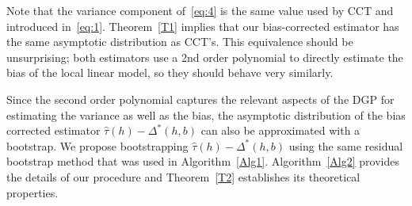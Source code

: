 \documentclass[12pt,fleqn]{article}
\begin{document}
Note that the variance component of~\eqref{eq:4} is the same value used by CCT
and introduced in~\eqref{eq:1}. Theorem~\ref{T1} implies that our bias-corrected
estimator has the same asymptotic distribution as CCT's. This equivalence should
be unsurprising; both estimators use a 2nd order polynomial to directly estimate
the bias of the local linear model, so they should behave very similarly.

Since the second order polynomial captures the relevant aspects of the DGP for
estimating the variance as well as the bias, the asymptotic distribution of the
bias corrected estimator $\hat\tau(h) - \Delta^*(h,b)$ can also be approximated
with a bootstrap. We propose bootstrapping $\hat\tau(h) - \Delta^*(h,b)$ using
the same residual bootstrap method that was used in
Algorithm~\ref{Alg1}. Algorithm~\ref{Alg2} provides the details of our procedure
and Theorem~\ref{T2} establishes its theoretical properties.
\end{document}
